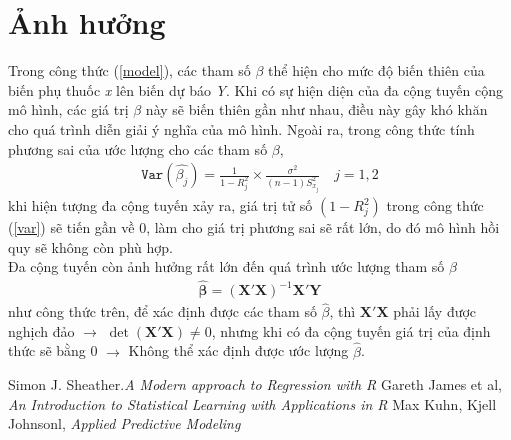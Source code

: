 \documentclass[12pt,a4papers]{article}
\begin{document}
\section{Ảnh hưởng}
Trong công thức (\ref{model}), các tham số $\beta$ thể hiện cho mức độ biến thiên của biến phụ thuốc \textit{x} lên biến dự báo \textit{Y}. Khi có sự hiện diện của đa cộng tuyến cộng mô hình, các giá trị $\beta$ này sẽ biến thiên gần như nhau, điều này gây khó khăn cho quá trình diễn giải ý nghĩa của mô hình. Ngoài ra, trong công thức tính phương sai của ước lượng cho các tham số $\beta$,
\begin{align}
    \texttt{Var}(\hat{\beta_j}) = \displaystyle \frac{1}{1-\textit{R}^{2}_{j}} \times \frac{\sigma^2}{(\textit{n} - 1) \textit{S}^2_{x_j}}\quad \textit{j} = 1, 2      \label{var}
\end{align}
khi hiện tượng đa cộng tuyến xảy ra, giá trị tử số $(1-\textit{R}^{2}_{j})$ trong công thức (\ref{var}) sẽ tiến gần về 0, làm cho giá trị phương sai sẽ rất lớn, do đó mô hình hồi quy sẽ không còn phù hợp. \\
Đa cộng tuyến còn ảnh hưởng rất lớn đến quá trình ước lượng tham số $\beta$
\begin{align}
\mathbf{\hat{\beta}} = (\textbf{X}'\textbf{X})^{-1}\textbf{X}'\textbf{Y}
\end{align}
như công thức trên, để xác định được các tham số $\hat{\beta}$, thì $\textbf{X}'\textbf{X}$ phải lấy được nghịch đảo $\to$ $\det(\textbf{X}'\textbf{X}) \neq 0$, nhưng khi có đa cộng tuyến giá trị của định thức sẽ bằng 0 $\to$ Không thể xác định được ước lượng $\hat{\beta}$.



\begin{thebibliography}{9}
Simon J. Sheather.\textit{A Modern approach to Regression with R}
Gareth James et al, \textit{An Introduction to Statistical Learning with Applications in R}
Max Kuhn, Kjell Johnsonl, \textit{Applied Predictive Modeling}
\end{thebibliography}
\end{document}
